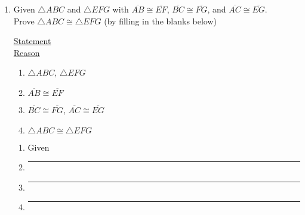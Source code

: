 \documentclass[12pt, twoside]{article}
\begin{document}
\begin{enumerate}
 \item Given $\triangle ABC$ and $\triangle EFG$ with $\overline{AB} \cong \overline{EF}$, $\overline{BC} \cong \overline{FG}$, and $\overline{AC} \cong \overline{EG}$. \\Prove $\triangle ABC \cong \triangle EFG$ (by filling in the blanks below)\\[0.5cm]
   \begin{multicols}{2}
     \underline{Statement} \\
     \underline{Reason}
   \end{multicols}
   \begin{multicols}{2}
     \raggedcolumns
     \begin{enumerate}[label={\arabic*)}]
       \item $\triangle ABC$, $\triangle EFG$
       \item $\overline{AB} \cong \overline{EF}$
       \item $\overline{BC} \cong \overline{FG}$, $\overline{AC} \cong \overline{EG}$
       \item $\triangle ABC \cong \triangle EFG$ \\
     \end{enumerate}
     \begin{enumerate}[label={\arabic*)}]
       \item Given
       \item \rule{4cm}{0.15mm}
       \item \rule{4cm}{0.15mm}
       \item \rule{4cm}{0.15mm}
     \end{enumerate}
   \end{multicols}


\end{enumerate}
\end{document}
